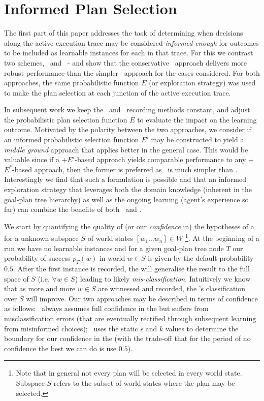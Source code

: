 \section{Informed Plan Selection}\label{sec:coverage}

The first part of this paper addresses the task of determining when decisions along the active execution trace may be considered \textit{informed enough} for outcomes to be included as learnable instances for each \dt in that trace. For this we contrast two schemes, \CL\ and \BUL\ - and show that the conservative \BUL\ approach delivers more robust performance than the simpler \CL\ approach for the cases considered. For both approaches, the same probabilistic function $E$ (or exploration strategy) was used to make the plan selection at each junction of the active execution trace.

In subsequent work we keep the \CL\ and \BUL\ recording methods constant, and adjust the probabilistic plan selection function $E$ to evaluate the impact on the learning outcome. Motivated by the polarity between the two approaches, we consider if an informed probabilistic selection function $E'$ may be constructed to yield a \textit{middle ground} approach that applies better in the general case. This would be valuable since if a \CL+$E'$-based approach yields comparable performance to any \BUL+$E^*$-based approach, then the former is preferred as \CL\ is much simpler than \BUL. Interestingly we find that such a formulation is possible and that an informed exploration strategy that leverages both the domain knowledge (inherent in the goal-plan tree hierarchy) as well as the ongoing learning (agent's experience so far) can combine the benefits of both \CL\ and \BUL.

We start by quantifying the quality of (or our \textit{confidence} in) the hypotheses of a \dt for a unknown subspace $S$ of world states $[w_1 \ldots w_n] \in W$ \footnote{Note that in general not every plan will be selected in every world state. Subspace $S$ refers to the subset of world states where the plan may be selected.}. At the beginning of a run we have no learnable instances and for a given goal-plan tree node $T$ our probability of success $p_T(w)$ in world $w \in S$ is given by the default probability $0.5$. After the first instance is recorded, the \dt will generalise the result to the full space of $S$ (i.e. $\forall w \in S$) leading to likely \textit{mis-classification}. Intuitively we know that as more and more $w \in S$ are witnessed and recorded, the \dt's classification over $S$ will improve. Our two approaches may be described in terms of confidence as follows: \CL\ always assumes full confidence in the \dt but suffers from misclassification errors (that are eventually rectified through subsequent learning from misinformed choices); \BUL\ uses the static $\epsilon$ and $k$ values to determine the boundary for our confidence in the \dt (with the trade-off that for the period of no confidence the best we can do is use $0.5$).

